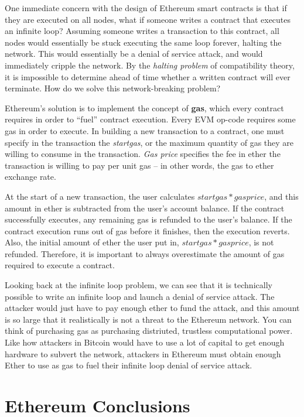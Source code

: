 \documentclass[full.tex]{subfiles}
\begin{document}
    One immediate concern with the design of Ethereum smart contracts is that if they are executed on all nodes, what if someone writes a contract that executes an infinite loop? Assuming someone writes a transaction to this contract, all nodes would essentially be stuck executing the same loop forever, halting the network. This would essentially be a denial of service attack, and would immediately cripple the network. By the \textit{halting problem} of compatibility theory, it is impossible to determine ahead of time whether a written contract will ever terminate. How do we solve this network-breaking problem?
    
    Ethereum's solution is to implement the concept of \textbf{gas}, which every contract requires in order to ``fuel'' contract execution. Every EVM op-code requires some gas in order to execute. In building a new transaction to a contract, one must specify in the transaction the \textit{startgas}, or the maximum quantity of gas they are willing to consume in the transaction. \textit{Gas price} specifies the fee in ether the transaction is willing to pay per unit gas -- in other words, the gas to ether exchange rate. 
    
    At the start of a new transaction, the user calculates $startgas * gasprice$, and this amount in ether is subtracted from the user's account balance. If the contract successfully executes, any remaining gas is refunded to the user's balance. If the contract execution runs out of gas before it finishes, then the execution reverts. Also, the initial amount of ether the user put in, $startgas * gasprice$, is not refunded. Therefore, it is important to always overestimate the amount of gas required to execute a contract. 
    
    Looking back at the infinite loop problem, we can see that it is technically possible to write an infinite loop and launch a denial of service attack. The attacker would just have to pay enough ether to fund the attack, and this amount is so large that it realistically is not a threat to the Ethereum network. You can think of purchasing gas as purchasing distriuted, trustless computational power. Like how attackers in Bitcoin would have to use a lot of capital to get enough hardware to subvert the network, attackers in Ethereum must obtain enough Ether to use as gas to fuel their infinite loop denial of service attack. 
    
    \section*{Ethereum Conclusions}
    
\end{document}
